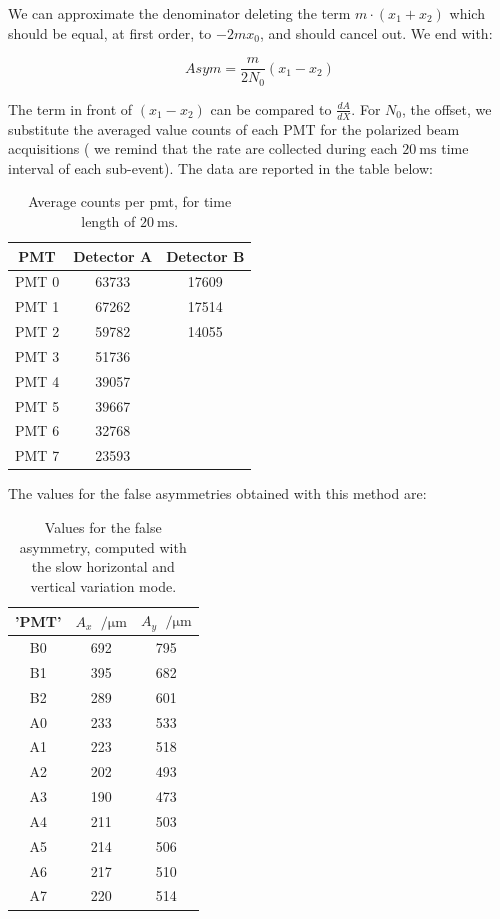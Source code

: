 We can approximate the denominator deleting the term $ m \cdot (x_{1} +  x_{2})$ which should be equal, at first order, to $- 2m x_{0}$, and should cancel out. We end with:

\begin{equation}
Asym = \dfrac{m}{2N_{0}}(x_{1} -  x_{2})
\end{equation}

The term in front of $(x_{1} - x_{2})$ can be compared to $\frac{dA}{dX}$. For $N_{0}$, the offset, we substitute the averaged value counts of each PMT for the polarized beam acquisitions ( we remind that the rate are collected during each $\SI{20}{\milli \second}$ time interval of each sub-event).
The data are reported in the table below:

\begin{table}[h]
\centering
\begin{tabular}{c|c|c}
\hline 
PMT & Detector A & Detector B \\ 
\hline
PMT 0 & 63733 & 17609 \\ 
PMT 1 & 67262 & 17514 \\ 
PMT 2 & 59782 & 14055 \\ 
PMT 3 & 51736 & \\ 
PMT 4 & 39057 & \\ 
PMT 5 & 39667 & \\ 
PMT 6 & 32768 & \\ 
PMT 7 & 23593 & \\ 
\hline 
\end{tabular}
\caption{Average counts per pmt, for time length of $\SI{20}{\milli \second}$.} 
\end{table}
 
The values for the false asymmetries obtained with this method are:

\begin{table}[h]
\centering
\begin{tabular}{c|c|c}
\hline
 'PMT' & $A_{x}$ $\SI{}{\per \micro \meter}$&   $A_{y}$ $\SI{}{\per \micro \meter}$ \\
\hline
 B0 & 692 & 795 \\
 B1 & 395 & 682 \\
 B2 & 289 & 601 \\
 A0 & 233 & 533 \\
 A1 & 223 & 518 \\
 A2 & 202 & 493 \\
 A3 & 190 & 473 \\
 A4 & 211 & 503 \\
 A5 & 214 & 506 \\
 A6 & 217 & 510 \\
 A7 & 220 & 514 \\
\hline
\end{tabular}
\caption{ Values for the false asymmetry, computed with the slow horizontal and vertical variation mode.}
\end{table}

